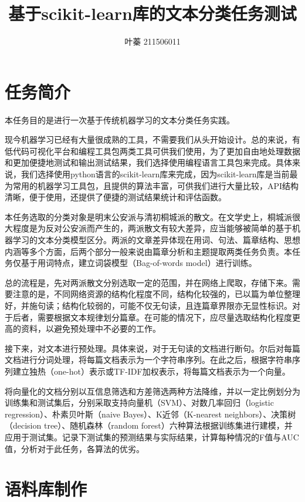 \documentclass[12pt, a4paper, oneside]{ctexart}
\title{基于scikit-learn库的文本分类任务测试}
\author{叶蓁 211506011}
\date{}
\begin{document}
\maketitle

\section{任务简介}

本任务目的是进行一次基于传统机器学习的文本分类任务实践。

现今机器学习已经有大量很成熟的工具，不需要我们从头开始设计。总的来说，有低代码可视化平台和编程工具包两类工具可供我们使用，为了更加自由地处理数据和更加便捷地测试和输出测试结果，我们选择使用编程语言工具包来完成。具体来说，我们选择使用python语言的scikit-learn库来完成，因为scikit-learn库是当前最为常用的机器学习工具包，且提供的算法丰富，可供我们进行大量比较，API结构清晰，便于使用，还提供了便捷的测试结果统计和评估函数。

本任务选取的分类对象是明末公安派与清初桐城派的散文。在文学史上，桐城派很大程度是为反对公安派而产生的，两派散文有较大差异，应当能够被简单的基于机器学习的文本分类模型区分。两派的文章差异体现在用词、句法、篇章结构、思想内涵等多个方面，后两个部分一般来说由篇章分析和主题提取两类任务负责。本任务仅基于用词特点，建立词袋模型（Bag-of-words model）进行训练。

总的流程是，先对两派散文分别选取一定的范围，并在网络上爬取，存储下来。需要注意的是，不同网络资源的结构化程度不同，结构化较强的，已以篇为单位整理好，并施句读；结构化较弱的，可能不仅无句读，且连篇章界限亦无显性标识。对于后者，需要根据文本规律划分篇章。在可能的情况下，应尽量选取结构化程度更高的资料，以避免预处理中不必要的工作。

接下来，对文本进行预处理。具体来说，对于无句读的文档进行断句。尔后对每篇文档进行分词处理，将每篇文档表示为一个字符串序列。在此之后，根据字符串序列建立独热（one-hot）表示或TF-IDF加权表示，将每篇文档表示为一个向量。

将向量化的文档分别以互信息筛选和方差筛选两种方法降维，并以一定比例划分为训练集和测试集后，分别采取支持向量机（SVM）、对数几率回归（logistic regression）、朴素贝叶斯（naive Bayes）、K近邻（K-nearest neighbors）、决策树（decision tree）、随机森林（random forest）六种算法根据训练集进行建模，并应用于测试集。记录下测试集的预测结果与实际结果，计算每种情况的F值与AUC值，分析对于此任务，各算法的优劣。

\section{语料库制作}
\end{document}
